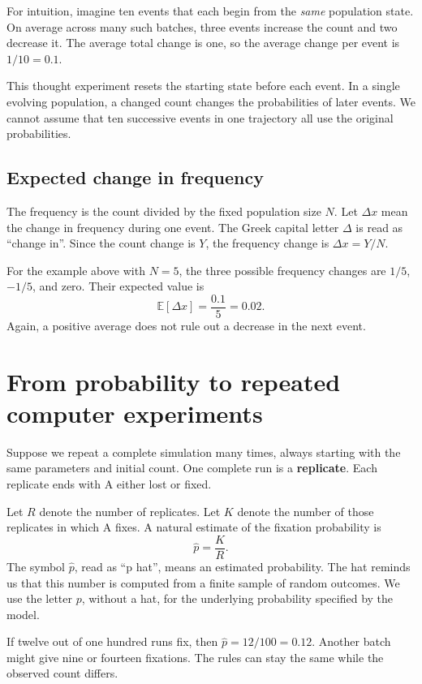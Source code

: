 For intuition, imagine ten events that each begin from the \emph{same}
population state. On average across many such batches, three events increase
the count and two decrease it. The average total change is one, so the
average change per event is \(1/10=0.1\).

This thought experiment resets the starting state before each event. In a
single evolving population, a changed count changes the probabilities of
later events. We cannot assume that ten successive events in one trajectory
all use the original probabilities.

\subsection{Expected change in frequency}

The frequency is the count divided by the fixed population size \(N\).
Let \(\Delta x\) mean the change in frequency during one event. The Greek
capital letter \(\Delta\) is read as ``change in''. Since the count change
is \(Y\), the frequency change is \(\Delta x=Y/N\).

For the example above with \(N=5\), the three possible frequency changes
are \(1/5\), \(-1/5\), and zero. Their expected value is
\[
 \mathbb{E}[\Delta x]=\frac{0.1}{5}=0.02.
\]
Again, a positive average does not rule out a decrease in the next event.

\section{From probability to repeated computer experiments}

Suppose we repeat a complete simulation many times, always starting with
the same parameters and initial count. One complete run is a
\textbf{replicate}. Each replicate ends with A either lost or fixed.

Let \(R\) denote the number of replicates. Let \(K\) denote the number of
those replicates in which A fixes. A natural estimate of the fixation
probability is
\[
 \widehat p=\frac{K}{R}.
\]
The symbol \(\widehat p\), read as ``p hat'', means an estimated probability.
The hat reminds us that this number is computed from a finite sample of
random outcomes. We use the letter \(p\), without a hat, for the underlying
probability specified by the model.

If twelve out of one hundred runs fix, then \(\widehat p=12/100=0.12\).
Another batch might give nine or fourteen fixations. The rules can stay the
same while the observed count differs.


